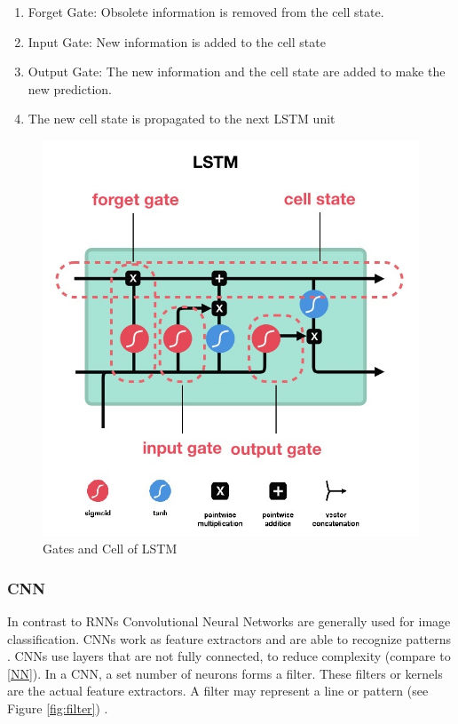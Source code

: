 \begin{enumerate}
	\item Forget Gate: Obsolete information is removed from the cell state.
	\item Input Gate: New information is added to the cell state
	\item Output Gate: The new information and the cell state are added to make the new prediction.
	\item The new cell state is propagated to the next LSTM unit  
\end{enumerate}
     
\begin{figure}[h]
	\centering
	\includegraphics[scale=0.5]{Figures/LSTM}
	\decoRule
	\caption[LSTM]{Gates and Cell of LSTM  \parencite{MichaelPhi2018}}
	\label{fig:LSTM}
\end{figure}



\subsubsection{CNN}
In contrast to RNNs Convolutional Neural Networks are generally used for image classification. CNNs work as feature extractors and are able to recognize patterns . CNNs use layers that are not fully connected, to reduce complexity (compare to \ref{NN}). In a CNN, a set number of neurons forms a filter. These filters or kernels are the actual feature extractors. A filter may represent a line or pattern (see Figure \ref{fig:filter}) \parencite{LeCun1998}.


